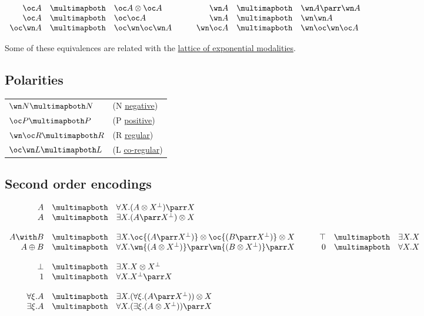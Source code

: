 \(\begin{array}{rclcrcl}
  \oc A & \linequiv&  \oc A\tens\oc A & \quad&  
  \wn A & \linequiv&  \wn A\parr\wn A\\
  \oc A & \linequiv&  \oc\oc A & \quad&  \wn A & \linequiv&  \wn\wn A\\
  \oc\wn A & \linequiv&  \oc\wn\oc\wn A & \quad&  \wn\oc A & \linequiv&  \wn\oc\wn\oc A\\
\end{array}\)

Some of these equivalences are related with the
\hyperref[lattice-of-exponential-modalities]{lattice of exponential modalities}.

\subsection{Polarities}\label{polarities}

\begin{center}
\begin{tabular}{ll}
\hline
\(\wn N \linequiv N\) & (N \hyperref[negative-formula]{negative})\\
\(\oc P \linequiv P\) & (P \hyperref[positive-formula]{positive})\\
\(\wn\oc R \linequiv R\) & (R \hyperref[regular-formula]{regular})\\
\(\oc\wn L \linequiv L\) & (L \hyperref[regular-formula]{co-regular})\\
\hline
\end{tabular}
\end{center}

\subsection{Second order encodings}\label{second-order-encodings}

\(\begin{array}{rclcrcl}
  A & \linequiv & \forall X . (A \tens X\orth) \parr X \\
  A & \linequiv & \exists X . (A \parr X\orth) \tens X \\
\\
  A \with B & \linequiv&  \exists X . \oc{(A \parr X\orth)} \tens \oc{(B \parr X\orth)} \tens X & \quad&  \top & \linequiv&  \exists X . X \\
  A \plus B & \linequiv&  \forall X . \wn{(A \tens X\orth)} \parr \wn{(B \tens X\orth)} \parr X & \quad&  \zero & \linequiv&  \forall X . X \\
\\
 \bot & \linequiv&  \exists X . X\tens X\orth \\
 \one & \linequiv&  \forall X . X\orth\parr X \\
\\
  \forall \xi . A & \linequiv&  \exists X . (\forall \xi . (A \parr X\orth)) \tens X \\
  \exists \xi . A & \linequiv&  \forall X . (\exists \xi . (A \tens X\orth)) \parr X
\end{array}\)

